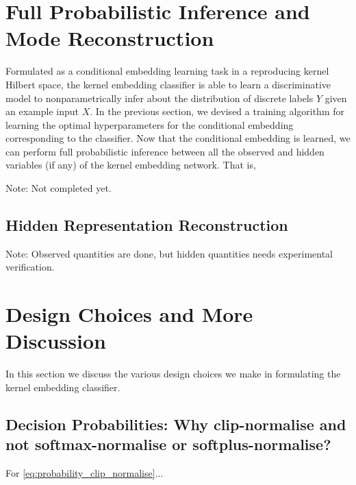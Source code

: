 \documentclass{article}
\newcommand{\note}[1]{{\color{orange} #1}}
\begin{document}
\newpage
\section{Full Probabilistic Inference and Mode Reconstruction}
\label{app:mode_reconstruction}

	Formulated as a conditional embedding learning task in a reproducing kernel Hilbert space, the kernel embedding classifier is able to learn a discriminative model to nonparametrically infer about the distribution of discrete labels $Y$ given an example input $X$. In the previous section, we devised a training algorithm for learning the optimal hyperparameters for the conditional embedding corresponding to the classifier. Now that the conditional embedding is learned, we can perform full probabilistic inference between all the observed and hidden variables (if any) of the kernel embedding network. That is, 
	
	\note{Note: Not completed yet.}
	
	\subsection{Hidden Representation Reconstruction}

		\note{Note: Observed quantities are done, but hidden quantities needs experimental verification.}

\newpage
\section{Design Choices and More Discussion}
\label{app:design_choices}

	In this section we discuss the various design choices we make in formulating the kernel embedding classifier.

	\subsection{Decision Probabilities: Why clip-normalise and not softmax-normalise or softplus-normalise?}
	
		For \eqref{eq:probability_clip_normalise}...
		
\end{document}
